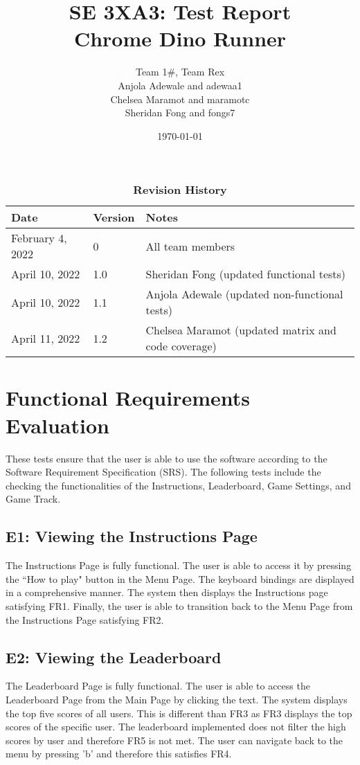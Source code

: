 \documentclass[12pt, titlepage]{article}
\title{SE 3XA3: Test Report\\Chrome Dino Runner}
\author{Team 1\#, Team Rex
		\\ Anjola Adewale and adewaa1
		\\ Chelsea Maramot and maramotc
		\\ Sheridan Fong and fongs7
}
\date{\today}
\begin{document}
\maketitle

\tableofcontents
\listoftables
\listoffigures


\newpage

\newpage
\begin{table}[h]
\caption{\bf Revision History}
\begin{tabularx}{\textwidth}{p{3cm}p{2cm}X}
    \toprule {\bf Date} & {\bf Version} & {\bf Notes}\\
    \midrule
    February 4, 2022 & 0 & All team members\\
    \midrule
    April 10, 2022 & 1.0 & Sheridan Fong (updated functional tests)\\
    \midrule
    April 10, 2022 & 1.1 & Anjola Adewale (updated non-functional tests)\\
    \midrule
    April 11, 2022 & 1.2 & Chelsea Maramot (updated matrix and code coverage)\\
    \bottomrule
    
\end{tabularx}
\end{table}
\newpage

\section{Functional Requirements Evaluation}

These tests ensure that the user is able to use the software according to the Software Requirement Specification (SRS). The following tests include the checking the functionalities of the Instructions, Leaderboard, Game Settings, and Game Track.

\subsection{E1: Viewing the Instructions Page}
The Instructions Page is fully functional. The user is able to access it by pressing the ``How to play" button in the Menu Page. The keyboard bindings are displayed in a comprehensive manner. The system then displays the Instructions page satisfying FR1. Finally, the user is able to transition back to the Menu Page from the Instructions Page satisfying FR2.

\subsection{E2: Viewing the Leaderboard}
The Leaderboard Page is fully functional. The user is able to access the Leaderboard Page from the Main Page by clicking the text. The system displays the top five scores of all users. This is different than FR3 as FR3 displays the top scores of the specific user. The leaderboard implemented does not filter the high scores by user and therefore FR5 is not met. The user can navigate back to the menu by pressing 'b' and therefore this satisfies FR4. 
\end{document}
